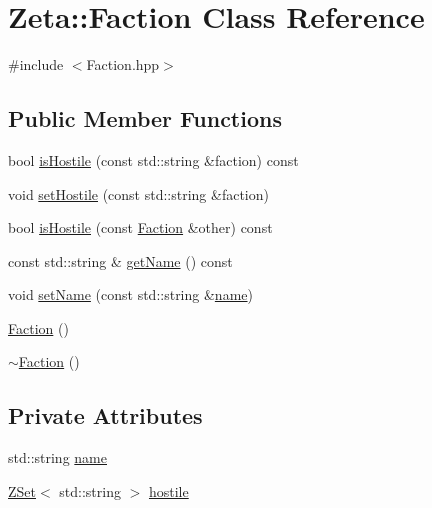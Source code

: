 \hypertarget{classZeta_1_1Faction}{\section{Zeta\+:\+:Faction Class Reference}
\label{classZeta_1_1Faction}
}


{\ttfamily \#include $<$Faction.\+hpp$>$}

\subsection*{Public Member Functions}
\begin{DoxyCompactItemize}
\item 
bool \hyperlink{classZeta_1_1Faction_ac7c799b5795f9d8c8e2500e38a3c34cc}{is\+Hostile} (const std\+::string \&faction) const 
\item 
void \hyperlink{classZeta_1_1Faction_ac2d2bf47fb9ab58d11ad42ecb41f981a}{set\+Hostile} (const std\+::string \&faction)
\item 
bool \hyperlink{classZeta_1_1Faction_a11c964d71ab86f957d2c07f57850a0cc}{is\+Hostile} (const \hyperlink{classZeta_1_1Faction}{Faction} \&other) const 
\item 
const std\+::string \& \hyperlink{classZeta_1_1Faction_a78d4f731dc466fd24f44dc4fb1cf2c7e}{get\+Name} () const 
\item 
void \hyperlink{classZeta_1_1Faction_a9baca188f1cc1f54ba431a722437333e}{set\+Name} (const std\+::string \&\hyperlink{classZeta_1_1Faction_aff5abc55d9c2e0ae29d2560c633ceb1e}{name})
\item 
\hyperlink{classZeta_1_1Faction_a317ef98f8262e3fceb5fe94eda85fd1f}{Faction} ()
\item 
\hyperlink{classZeta_1_1Faction_acd3a2c24832295b193183e71bcdae349}{$\sim$\+Faction} ()
\end{DoxyCompactItemize}
\subsection*{Private Attributes}
\begin{DoxyCompactItemize}
\item 
std\+::string \hyperlink{classZeta_1_1Faction_aff5abc55d9c2e0ae29d2560c633ceb1e}{name}
\item 
\hyperlink{namespaceZeta_a92c229b4db6ab7275c2b7f32bdfabc87}{Z\+Set}$<$ std\+::string $>$ \hyperlink{classZeta_1_1Faction_a3155b01010dbaba9b6143fab550a4885}{hostile}
\end{DoxyCompactItemize}


